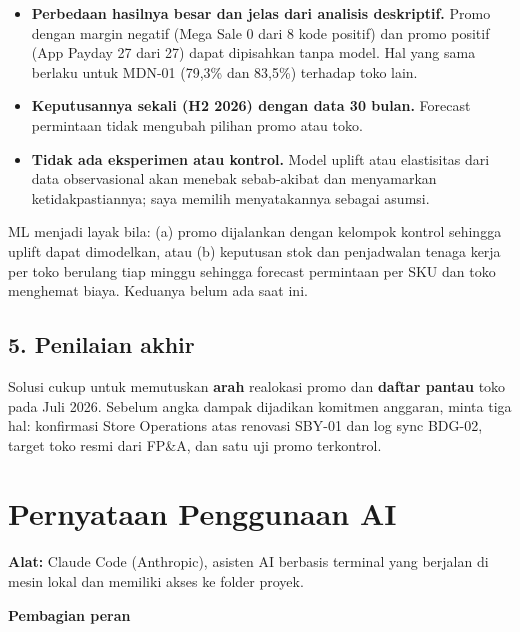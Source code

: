 \documentclass[10pt,a4paper]{article}
\providecommand{\tightlist}{\setlength{\itemsep}{1pt}\setlength{\parskip}{0pt}}
\begin{document}
\begin{itemize}
\tightlist
\item
  \textbf{Perbedaan hasilnya besar dan jelas dari analisis deskriptif.} Promo dengan margin negatif (Mega Sale 0 dari 8 kode positif) dan promo positif (App Payday 27 dari 27) dapat dipisahkan tanpa model. Hal yang sama berlaku untuk MDN-01 (79,3\% dan 83,5\%) terhadap toko lain.
\item
  \textbf{Keputusannya sekali (H2 2026) dengan data 30 bulan.} Forecast permintaan tidak mengubah pilihan promo atau toko.
\item
  \textbf{Tidak ada eksperimen atau kontrol.} Model uplift atau elastisitas dari data observasional akan menebak sebab-akibat dan menyamarkan ketidakpastiannya; saya memilih menyatakannya sebagai asumsi.
\end{itemize}

ML menjadi layak bila: (a) promo dijalankan dengan kelompok kontrol sehingga uplift dapat dimodelkan, atau (b) keputusan stok dan penjadwalan tenaga kerja per toko berulang tiap minggu sehingga forecast permintaan per SKU dan toko menghemat biaya. Keduanya belum ada saat ini.

\subsection{5. Penilaian akhir}\label{penilaian-akhir}

Solusi cukup untuk memutuskan \textbf{arah} realokasi promo dan \textbf{daftar pantau} toko pada Juli 2026. Sebelum angka dampak dijadikan komitmen anggaran, minta tiga hal: konfirmasi Store Operations atas renovasi SBY-01 dan log sync BDG-02, target toko resmi dari FP\&A, dan satu uji promo terkontrol.

\section{Pernyataan Penggunaan AI}\label{pernyataan-penggunaan-ai}

\textbf{Alat:} Claude Code (Anthropic), asisten AI berbasis terminal yang berjalan di mesin lokal dan memiliki akses ke folder proyek.

\textbf{Pembagian peran}
\end{document}
